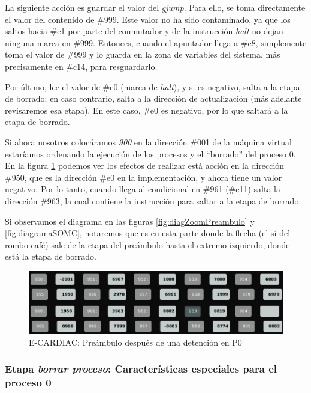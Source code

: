 \documentclass[letterpaper,12pt,oneside]{book}
\begin{document}
        La siguiente acción es guardar el valor del \textit{gjump}. Para ello, se toma directamente el valor del
		contenido de \#999. Este valor no ha sido contaminado, ya que
		los saltos hacia \#e1 por parte del conmutador y de la instrucción \textit{halt} no dejan ninguna marca en \#999.
		Entonces, cuando el apuntador llega a \#e8, simplemente toma el
		valor de \#999 y lo guarda en la zona de variables del sistema, más precisamente en \#c14, para resguardarlo.
  
        Por último, lee el valor de \#e0 (marca de \textit{halt}), y si es negativo, salta a la etapa de borrado;
		en caso contrario, salta a la dirección de actualización (más adelante revisaremos esa etapa).
		 En este caso, \#e0 es negativo, por lo que saltará a la etapa de borrado.

		Si ahora nosotros colocáramos \textit{900} en la dirección \#001 de la máquina virtual estaríamos ordenando la ejecución de los procesos
		y el ``borrado'' del proceso 0.
		En la figura \ref{fig:eccPreamHaltP0} podemos ver los efectos de realizar está acción 
		en la dirección \#950, que es la dirección \#e0 en la implementación,
		y ahora tiene un valor negativo. Por lo tanto, cuando llega
		al condicional en \#961 (\#e11) salta la dirección \#963, la cual contiene la instrucción para saltar a la etapa de borrado. 
		
		Si observamos 
		el diagrama en las figuras \ref{fig:diagZoomPreambulo} y \ref{fig:diagramaSOMC}, notaremos que es en esta parte donde 
		la flecha (el sí del rombo café)  sale de la etapa del preámbulo hasta el extremo izquierdo, donde está la etapa de borrado.

		
		\begin{figure}[h]		
			\centering
			\includegraphics[scale=0.4]{media/CARDIACC/eccPreambuloHaltOpP0.png}
			\caption{ E-CARDIAC: Preámbulo después de una detención en P0}
			\label{fig:eccPreamHaltP0}
		\end{figure}
		
		\subsubsection{Etapa \textit{borrar proceso}: Características especiales para el proceso 0}
		
\end{document}
